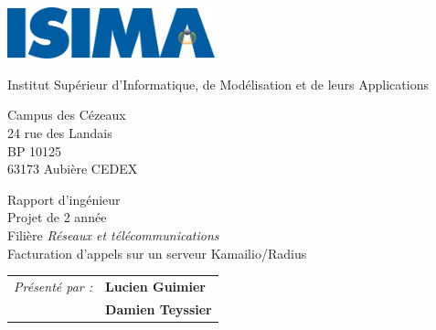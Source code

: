 \thispagestyle{empty}

\includegraphics[width=6cm]{images/isima.png}

\vspace{0.5cm}

\begin{minipage}{4cm}
\begin{flushleft}
	Institut Supérieur d’Informatique, de Modélisation et de leurs Applications
	
	\vspace{0.5cm}
	
	\small{ Campus des Cézeaux \\ 24 rue des Landais \\ BP 10125 \\ 63173 Aubière CEDEX }
\end{flushleft}
\end{minipage}

\vspace{4cm}

\begin{center}
	Rapport d’ingénieur \\
	Projet de 2{\ieme} année \\
	Filière {\em{Réseaux et télécommunications}} \\
	\Large{Facturation d’appels sur un serveur Kamailio/Radius}
\end{center}

\vspace{2cm}

\large{
\begin{tabular}{ll}
\textit{Présenté par :} & \textbf{Lucien Guimier} \\
& \textbf{Damien Teyssier}
\end{tabular}
}

\todo
